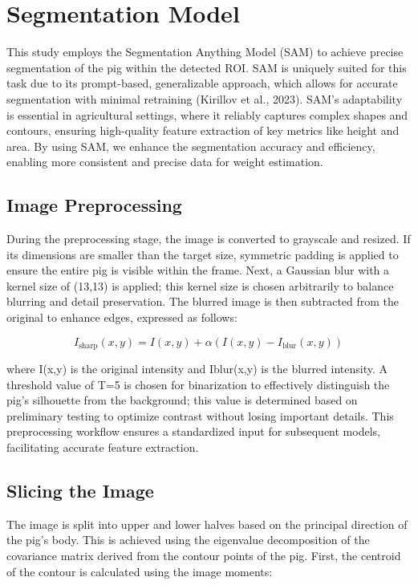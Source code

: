 {\section{Segmentation Model}
This study employs the Segmentation Anything Model (SAM) to achieve precise segmentation of the pig within the detected ROI. SAM is uniquely suited for this task due to its prompt-based, generalizable approach, which allows for accurate segmentation with minimal retraining (Kirillov et al., 2023). SAM’s adaptability is essential in agricultural settings, where it reliably captures complex shapes and contours, ensuring high-quality feature extraction of key metrics like height and area. By using SAM, we enhance the segmentation accuracy and efficiency, enabling more consistent and precise data for weight estimation.
\subsection{Image Preprocessing}
During the preprocessing stage, the image is converted to grayscale and resized. If its dimensions are smaller than the target size, symmetric padding is applied to ensure the entire pig is visible within the frame. Next, a Gaussian blur with a kernel size of (13,13) is applied; this kernel size is chosen arbitrarily to balance blurring and detail preservation. The blurred image is then subtracted from the original to enhance edges, expressed as follows:


\begin{equation}
	I_{\text{sharp}}(x, y) = I(x, y) + \alpha (I(x, y) - I_{\text{blur}}(x, y))
\end{equation}

where I(x,y) is the original intensity and Iblur(x,y) is the blurred intensity. A threshold value of T=5 is chosen for binarization to effectively distinguish the pig’s silhouette from the background; this value is determined based on preliminary testing to optimize contrast without losing important details. This preprocessing workflow ensures a standardized input for subsequent models, facilitating accurate feature extraction.

\subsection{Slicing the Image}
The image is split into upper and lower halves based on the principal direction of the pig’s body. This is achieved using the eigenvalue decomposition of the covariance matrix derived from the contour points of the pig. First, the centroid of the contour is calculated using the image moments:

}
